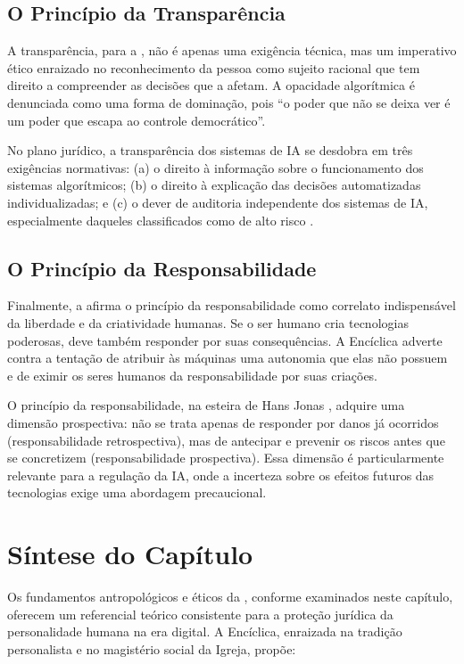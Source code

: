 \subsection{O Princípio da Transparência}
\label{subsec:principio-transparencia}

A transparência, para a \MH{}, não é apenas uma exigência técnica, mas um imperativo ético enraizado no reconhecimento da pessoa como sujeito racional que tem direito a compreender as decisões que a afetam. A opacidade algorítmica é denunciada como uma forma de dominação, pois ``o poder que não se deixa ver é um poder que escapa ao controle democrático''.

No plano jurídico, a transparência dos sistemas de IA se desdobra em três exigências normativas: (a) o direito à informação sobre o funcionamento dos sistemas algorítmicos; (b) o direito à explicação das decisões automatizadas individualizadas; e (c) o dever de auditoria independente dos sistemas de IA, especialmente daqueles classificados como de alto risco \cite{Wachter2017TSP}.

\subsection{O Princípio da Responsabilidade}
\label{subsec:principio-responsabilidade}

Finalmente, a \MH{} afirma o princípio da responsabilidade como correlato indispensável da liberdade e da criatividade humanas. Se o ser humano cria tecnologias poderosas, deve também responder por suas consequências. A Encíclica adverte contra a tentação de atribuir às máquinas uma autonomia que elas não possuem e de eximir os seres humanos da responsabilidade por suas criações.

O princípio da responsabilidade, na esteira de Hans Jonas \cite{Jonas1979PR}, adquire uma dimensão prospectiva: não se trata apenas de responder por danos já ocorridos (responsabilidade retrospectiva), mas de antecipar e prevenir os riscos antes que se concretizem (responsabilidade prospectiva). Essa dimensão é particularmente relevante para a regulação da IA, onde a incerteza sobre os efeitos futuros das tecnologias exige uma abordagem precaucional.

\section{Síntese do Capítulo}
\label{sec:sumario-cap2}

Os fundamentos antropológicos e éticos da \MH{}, conforme examinados neste capítulo, oferecem um referencial teórico consistente para a proteção jurídica da personalidade humana na era digital. A Encíclica, enraizada na tradição personalista e no magistério social da Igreja, propõe:

